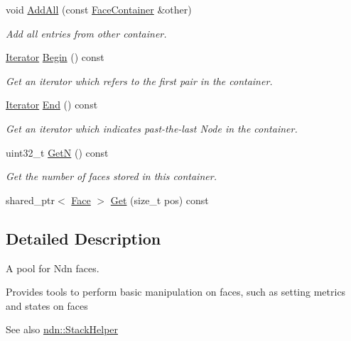 \begin{DoxyCompactItemize}
void \hyperlink{classns3_1_1ndn_1_1FaceContainer_aca98a1f4f22b696fa4bb8fb89a770146}{Add\+All} (const \hyperlink{classns3_1_1ndn_1_1FaceContainer}{Face\+Container} \&other)
\begin{DoxyCompactList}\small\item\em Add all entries from other container. \end{DoxyCompactList}\item 
\hyperlink{classns3_1_1ndn_1_1FaceContainer_a73807fcd505b7b06616d1965ed9dea54}{Iterator} \hyperlink{classns3_1_1ndn_1_1FaceContainer_ae234ef6e118b930e1e11867c10b772be}{Begin} () const
\begin{DoxyCompactList}\small\item\em Get an iterator which refers to the first pair in the container. \end{DoxyCompactList}\item 
\hyperlink{classns3_1_1ndn_1_1FaceContainer_a73807fcd505b7b06616d1965ed9dea54}{Iterator} \hyperlink{classns3_1_1ndn_1_1FaceContainer_a102b6a33ac3701769c79466cfe9fd743}{End} () const
\begin{DoxyCompactList}\small\item\em Get an iterator which indicates past-\/the-\/last Node in the container. \end{DoxyCompactList}\item 
uint32\+\_\+t \hyperlink{classns3_1_1ndn_1_1FaceContainer_aa6342b7a62f643613cbb45c3085716e9}{GetN} () const
\begin{DoxyCompactList}\small\item\em Get the number of faces stored in this container. \end{DoxyCompactList}\item 
shared\+\_\+ptr$<$ \hyperlink{classnfd_1_1Face}{Face} $>$ \hyperlink{classns3_1_1ndn_1_1FaceContainer_aadca3b68bafa19891d7552c1eac888a6}{Get} (size\+\_\+t pos) const
\end{DoxyCompactItemize}


\subsection{Detailed Description}
A pool for Ndn faces. 

Provides tools to perform basic manipulation on faces, such as setting metrics and states on faces

\begin{DoxySeeAlso}{See also}
\hyperlink{classns3_1_1ndn_1_1StackHelper}{ndn\+::\+Stack\+Helper} 
\end{DoxySeeAlso}


